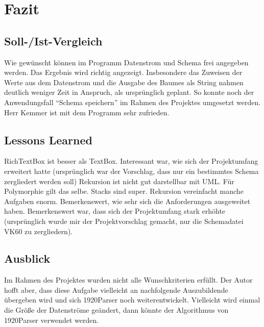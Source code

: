 \section{Fazit} 
\label{sec:Fazit}

\subsection{Soll-/Ist-Vergleich}
\label{sec:SollIstVergleich}
Wie gewünscht können im Programm Datenstrom und Schema frei angegeben werden. Das Ergebnis wird richtig angezeigt.
Insbesondere das Zuweisen der Werte aus dem Datenstrom und die Ausgabe des Baumes als String nahmen deutlich weniger Zeit in Anspruch, als ursprünglich geplant. So konnte noch der Anwendungsfall ``Schema speichern'' im Rahmen des Projektes umgesetzt werden.
Herr Kemmer ist mit dem Programm sehr zufrieden.
\subsection{Lessons Learned}
\label{sec:LessonsLearned}
RichTextBox ist besser als TextBox.
Interessant war, wie sich der Projektumfang erweitert hatte (ursprünglich war der Vorschlag, dass nur ein bestimmtes Schema zergliedert werden soll)
Rekursion ist nicht gut darstellbar mit UML. Für Polymorphie gilt das selbe. Stacks sind super. Rekursion vereinfacht manche Aufgaben enorm. Bemerkenswert, wie sehr sich die Anforderungen ausgeweitet haben.
Bemerkenswert war, dass sich der Projektumfang stark erhöhte (ursprünglich wurde mir der Projektvorschlag gemacht, nur die Schemadatei VK60 zu zergliedern).
\subsection{Ausblick}
\label{sec:Ausblick}
Im Rahmen des Projektes wurden nicht alle Wunschkriterien erfüllt. Der Autor hofft aber, dass diese Aufgabe vielleicht an nachfolgende Auszubildende übergeben wird und sich 1920Parser noch weiterentwickelt. Vielleicht wird einmal die Größe der Datenströme geändert, dann könnte der Algorithmus von 1920Parser verwendet werden.





